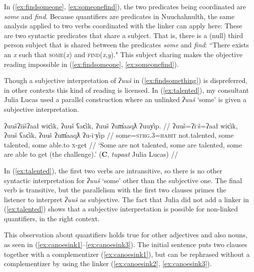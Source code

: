In (\ref{ex:findsomeone}, \ref{ex:someonefind}), the two predicates being coordinated are \textit{some} and \textit{find}. Because quantifiers are predicates in Nuuchahnulth, the same analysis applied to two verbs coordinated with the linker can apply here: These are two syntactic predicates that share a subject. That is, there is a (null) third person subject that is shared between the predicates \textit{some} and \textit{find}: ``There exists an \textit{x} such that \textsc{some}(\textit{x}) and \textsc{find}(\textit{x},\textit{y})." This subject sharing makes the objective reading impossible in (\ref{ex:findsomeone}, \ref{ex:someonefind}).

Though a subjective interpretation of \textit{ʔuuš} in (\ref{ex:findsomething}) is dispreferred, in other contexts this kind of reading is licensed. In (\ref{ex:talented}), my consultant Julia Lucas used a parallel construction where an unlinked \textit{ʔuuš} `some' is given a subjective interpretation.

\ex \label{ex:talented}
\begingl
\glpreamble ʔuušʔiišʔaał wic̓ik, ʔuuš ʕac̓ik, ʔuuš ʔum̓aaqƛ ʔuuy̓ip. //
\gla ʔuuš=ʔiˑš=ʔaał wic̓ik, ʔuuš ʕac̓ik, ʔuuš ʔum̓aaqƛ ʔu-iˑy̓ip //
\glb some=\textsc{strg.3}=\textsc{habit} not.talented, some talented, some able.to \textsc{x}-get //
\glft `Some are not talented, some are talented, some are able to get (the challenge).' (\textbf{C}, \textit{tupaat} Julia Lucas) //
\endgl
\xe

In (\ref{ex:talented}), the first two verbs are intransitive, so there is no other syntactic interpretation for \textit{ʔuuš} `some' other than the subjective one. The final verb is transitive, but the parallelism with the first two clauses primes the listener to interpret \textit{ʔuuš} as subjective. The fact that Julia did not add a linker in (\ref{ex:talented}) shows that a subjective interpretation is possible for non-linked quantifiers, in the right context. %

This observation about quantifiers holds true for other adjectives and also nouns, as seen in (\ref{ex:canoesink1}--\ref{ex:canoesink3}). The initial sentence puts two clauses together with a complementizer (\ref{ex:canoesink1}), but can be rephrased without a complementizer by using the linker (\ref{ex:canoesink2}, \ref{ex:canoesink3}).

